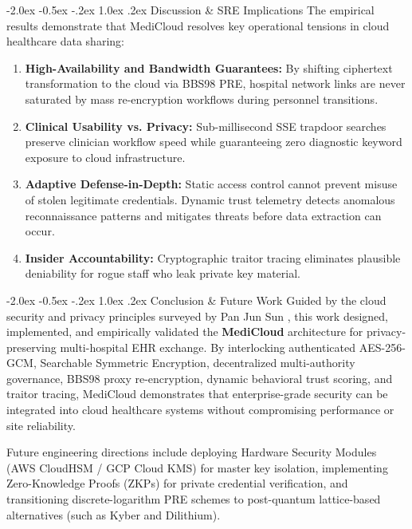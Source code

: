 \documentclass[10pt,twocolumn]{article}
\makeatletter
\renewcommand\section{\@startsection {section}{1}{\z@}%
  {-2.0ex \@plus -0.5ex \@minus -.2ex}%
  {1.0ex \@plus .2ex}%
  {\normalfont\normalsize\bfseries\scshape\color{primary}}}
\makeatother
\begin{document}
\section{Discussion \& SRE Implications}
The empirical results demonstrate that MediCloud resolves key operational tensions in cloud healthcare data sharing:
\begin{enumerate}
    \item \textbf{High-Availability and Bandwidth Guarantees:} By shifting ciphertext transformation to the cloud via BBS98 PRE, hospital network links are never saturated by mass re-encryption workflows during personnel transitions.
    \item \textbf{Clinical Usability vs. Privacy:} Sub-millisecond SSE trapdoor searches preserve clinician workflow speed while guaranteeing zero diagnostic keyword exposure to cloud infrastructure.
    \item \textbf{Adaptive Defense-in-Depth:} Static access control cannot prevent misuse of stolen legitimate credentials. Dynamic trust telemetry detects anomalous reconnaissance patterns and mitigates threats before data extraction can occur.
    \item \textbf{Insider Accountability:} Cryptographic traitor tracing eliminates plausible deniability for rogue staff who leak private key material.
\end{enumerate}

\section{Conclusion \& Future Work}
Guided by the cloud security and privacy principles surveyed by Pan Jun Sun \cite{sun2019privacy}, this work designed, implemented, and empirically validated the \textbf{MediCloud} architecture for privacy-preserving multi-hospital EHR exchange. By interlocking authenticated AES-256-GCM, Searchable Symmetric Encryption, decentralized multi-authority governance, BBS98 proxy re-encryption, dynamic behavioral trust scoring, and traitor tracing, MediCloud demonstrates that enterprise-grade security can be integrated into cloud healthcare systems without compromising performance or site reliability.

Future engineering directions include deploying Hardware Security Modules (AWS CloudHSM / GCP Cloud KMS) for master key isolation, implementing Zero-Knowledge Proofs (ZKPs) for private credential verification, and transitioning discrete-logarithm PRE schemes to post-quantum lattice-based alternatives (such as Kyber and Dilithium).
\end{document}
